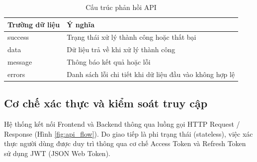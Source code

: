 \documentclass[12pt, a4paper]{report}
\begin{document}
\begin{table}[htbp]
\centering
\caption{Cấu trúc phản hồi API}
\label{tab:cau_truc_phan_hoi}
\begin{tabular}{|>{\raggedright\arraybackslash}p{5cm}|p{10cm}|}
\hline
\textbf{Trường dữ liệu} & \textbf{Ý nghĩa} \\
\hline
success & Trạng thái xử lý thành công hoặc thất bại \\
\hline
data & Dữ liệu trả về khi xử lý thành công \\
\hline
message & Thông báo kết quả hoặc lỗi \\
\hline
errors & Danh sách lỗi chi tiết khi dữ liệu đầu vào không hợp lệ \\
\hline
\end{tabular}
\end{table}

\subsection{Cơ chế xác thực và kiểm soát truy cập}
Hệ thống kết nối Frontend và Backend thông qua luồng gọi HTTP Request / Response (Hình \ref{fig:api_flow}). Do giao tiếp là phi trạng thái (stateless), việc xác thực người dùng được duy trì thông qua cơ chế Access Token và Refresh Token sử dụng JWT (JSON Web Token).
\end{document}
